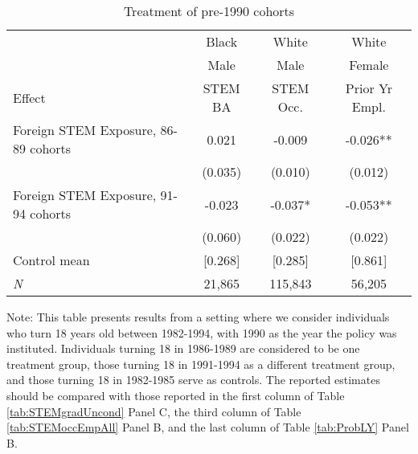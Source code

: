 \begin{table}[ht]
\caption{Treatment of pre-1990 cohorts}
\label{tab:ta000}
\centering
\begin{threeparttable}
\begin{tabular}{lccc}
\toprule 
       & Black           & White        & White       \\
       & Male            & Male         & Female      \\
Effect & STEM BA         & STEM Occ.    & Prior Yr Empl.\\
\midrule 
Foreign STEM Exposure, 86-89 cohorts & 0.021  & -0.009  & -0.026** \\ 
 &  (0.035)        & (0.010)        & (0.012) \\ 
Foreign STEM Exposure, 91-94 cohorts & -0.023  & -0.037* & -0.053** \\ 
 &  (0.060)        & (0.022)        & (0.022) \\ 
Control mean &  [0.268]           & [0.285]         & [0.861] \\ 
\emph{N} &     21,865          &   115,843          &    56,205 \\ 
\bottomrule 
\end{tabular} 
\footnotesize Note: This table presents results from a setting where we consider individuals who turn 18 years old between 1982-1994, with 1990 as the year the policy was instituted. Individuals turning 18 in 1986-1989 are considered to be one treatment group, those turning 18 in 1991-1994 as a different treatment group, and those turning 18 in 1982-1985 serve as controls. The reported estimates should be compared with those reported in the first column of Table \ref{tab:STEMgradUncond} Panel C, the third column of Table \ref{tab:STEMoccEmpAll} Panel B, and the last column of Table \ref{tab:ProbLY} Panel B.
\end{threeparttable} 
\end{table} 
